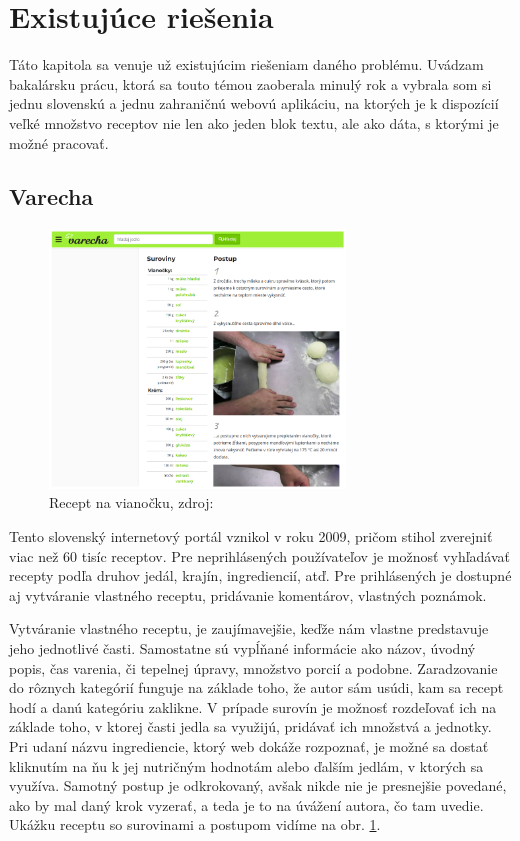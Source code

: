 \section{Existujúce riešenia} 
Táto kapitola sa venuje už existujúcim riešeniam daného problému. Uvádzam bakalársku prácu, ktorá sa touto témou zaoberala minulý rok a vybrala som si jednu slovenskú
a jednu zahraničnú webovú aplikáciu, na ktorých je k dispozícií veľké množstvo receptov nie len ako jeden blok textu, ale ako dáta, s ktorými je možné pracovať.

\subsection{Varecha}

\begin{figure}[h]
\centering
\includegraphics[width=0.7\textwidth]{images/varecha}
\caption{Recept na vianočku, zdroj: \cite{varecha}}
\label{varecha}
\end{figure}

Tento slovenský internetový portál \cite{varecha} vznikol v roku 2009, pričom stihol zverejniť viac
než 60 tisíc receptov. Pre neprihlásených používateľov je možnosť vyhľadávať recepty
podľa druhov jedál, krajín, ingrediencií, atď. Pre prihlásených je dostupné aj vytváranie
vlastného receptu, pridávanie komentárov, vlastných poznámok.

Vytváranie vlastného receptu, je zaujímavejšie, keďže nám vlastne predstavuje jeho
jednotlivé časti. Samostatne sú vypĺňané informácie ako názov, úvodný popis, čas varenia, či tepelnej úpravy, množstvo porcií a podobne. Zaradzovanie do rôznych kategórií
funguje na základe toho, že autor sám usúdi, kam sa recept hodí a danú kategóriu
zaklikne. V prípade surovín je možnosť rozdeľovať ich na základe toho, v ktorej časti
jedla sa využijú, pridávať ich množstvá a jednotky. Pri udaní názvu ingrediencie, ktorý
web dokáže rozpoznať, je možné sa dostať kliknutím na ňu k jej nutričným hodnotám
alebo ďalším jedlám, v ktorých sa využíva. Samotný postup je odkrokovaný, avšak nikde nie je presnejšie povedané, ako by mal daný krok vyzerať, a teda je to na úvážení
autora, čo tam uvedie. Ukážku receptu so surovinami a postupom vidíme na obr. \ref{varecha}.


